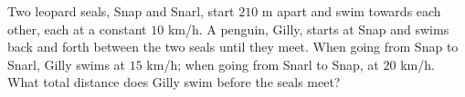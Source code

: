 Two leopard seals, Snap and Snarl, start $210$ m apart and swim towards each other, each at a constant $10$ km/h. A penguin, Gilly, starts at Snap and swims back and forth between the two seals until they meet. When going from Snap to Snarl, Gilly swims at $15$ km/h; when going from Snarl to Snap, at $20$ km/h. What total distance does Gilly swim before the seals meet?
